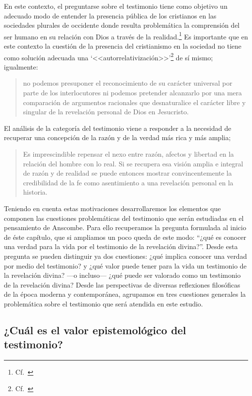   En este contexto, el preguntarse sobre el testimonio tiene como objetivo un adecuado modo de entender la presencia pública de los cristianos en las sociedades plurales de occidente donde resulta problemática la comprensión del ser humano en su relación con Dios a través de la realidad.\footnote{Cf.~\cite[75]{prades2015testimonio}} Es importante que en este contexto la cuestión de la presencia del cristianismo en la sociedad no tiene como solución adecuada una \enquote*{<<autorrelativización>>}\footnote{Cf.~\cite[75;\,40--44]{prades2015testimonio}} de sí mismo; igualmente: \blockquote[{\cite[75; Cf.~33--40]{prades2015testimonio}}]{no podemos presuponer el reconocimiento de su carácter universal por parte de los interlocutores ni podemos pretender alcanzarlo por una mera comparación de argumentos racionales que desnaturalice el carácter libre y singular de la revelación personal de Dios en Jesucristo.} El análisis de la categoría del testimonio viene a responder a la necesidad de recuperar una concepción de la razón y de la verdad más rica y más amplia; \blockquote[{\cite[76]{prades2015testimonio}}]{Es imprescindible repensar el nexo entre razón, afectos y libertad en la relación del hombre con lo real. Si se recupera esa visión amplia e integral de razón y de realidad se puede entonces mostrar convincentemente la credibilidad de la fe como asentimiento a una revelación personal en la historia.}

Teniendo en cuenta estas motivaciones desarrollaremos los elementos que componen las cuestiones problemáticas del testimonio que serán estudiadas en el pensamiento de Anscombe. Para ello recuperamos la pregunta formulada al inicio de éste capítulo, que si ampliamos un poco queda de este modo: \enquote{¿qué es conocer una verdad para la vida por el testimonio de la revelación divina?}. Desde esta pregunta se pueden distinguir ya dos cuestiones: ¿qué implica conocer una verdad por medio del testimonio? y ¿qué valor puede tener para la vida un testimonio de la revelación divina? ---o incluso--- ¿qué puede ser valorado como un testimonio de la revelación divina? Desde las perspectivas de diversas reflexiones filosóficas de la época moderna y contemporánea, agrupamos en tres cuestiones generales la problemática sobre el testimonio que será atendida en este estudio.

\subsection{¿Cuál es el valor epistemológico del testimonio?}

